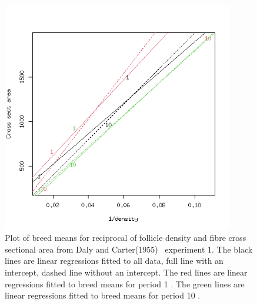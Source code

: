 %

\begin{figure}[h]
  \centering
   \includegraphics[width=0.9\textwidth]{DC1955/expt1reg.png}
  \caption{Plot of breed means for reciprocal of follicle density and fibre cross sectional area from Daly and Carter(1955)~\cite{daly:55} experiment 1. The black lines are linear regressions fitted to all data, full line with an intercept, dashed line without an intercept. The red lines are linear regressions fitted to breed means for period 1 . The green lines are linear regressions fitted to breed means for period 10 .}
  \label{fig:dcexpt1reg}
\end{figure}

%


